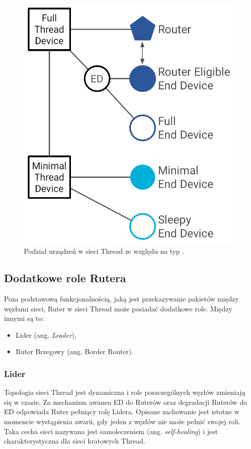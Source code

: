         \begin{figure}[H]
            \centering
            \includegraphics[width=0.8\linewidth]{graphics/ot-primer-taxonomy.png}
            \caption{Podział urządzeń w sieci Thread ze względu na typ \cite{ot-devices}.}
            \label{fig:thread-device-taxonomy}
        \end{figure}

    \subsection{Dodatkowe role Rutera}

        Poza podstawową funkcjonalnością, jaką jest przekazywanie pakietów między węzłami sieci, Ruter w sieci Thread może posiadać dodatkowe role. Między innymi są to:
        \begin{itemize}
            \item Lider (ang. \textit{Leader}),
            \item Ruter Brzegowy (ang. Border Router).
        \end{itemize}

        \subsubsection{Lider}

        Topologia sieci Thread jest dynamiczna i role poszczególnych węzłów zmieniają się w czasie. Za mechanizm awansu ED do Ruterów oraz degradacji Ruterów do ED odpowiada Ruter pełniący rolę Lidera. Opisane zachowanie jest istotne w momencie wystąpienia awarii, gdy jeden z węzłów nie może pełnić swojej roli. Taka cecha sieci nazywana jest samoleczeniem (ang. \textit{self-healing}) i jest charakterystyczna dla sieci kratowych Thread.

